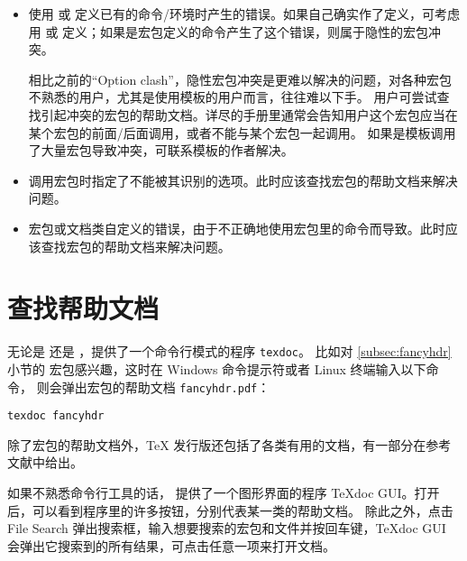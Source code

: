 \begin{itemize}
\item {}

使用  或  定义已有的命令/环境时产生的错误。如果自己确实作了定义，可考虑用
 或  定义；如果是宏包定义的命令产生了这个错误，则属于隐性的宏包冲突。

相比之前的“Option clash”，隐性宏包冲突是更难以解决的问题，对各种宏包不熟悉的用户，尤其是使用模板的用户而言，往往难以下手。
用户可尝试查找引起冲突的宏包的帮助文档。详尽的手册里通常会告知用户这个宏包应当在某个宏包的前面/后面调用，或者不能与某个宏包一起调用。
如果是模板调用了大量宏包导致冲突，可联系模板的作者解决。

\item {}

调用宏包时指定了不能被其识别的选项。此时应该查找宏包的帮助文档来解决问题。

\item {}

宏包或文档类自定义的错误，由于不正确地使用宏包里的命令而导致。此时应该查找宏包的帮助文档来解决问题。

\end{itemize}

\section{查找帮助文档}\label{sec:texdoc}

无论是  还是 ，提供了一个命令行模式的程序 \texttt{texdoc}。
比如对 \ref{subsec:fancyhdr} 小节的  宏包感兴趣，这时在 Windows 命令提示符或者 Linux 终端输入以下命令，
则会弹出宏包的帮助文档 \texttt{fancyhdr.pdf}：
\begin{verbatim}
texdoc fancyhdr
\end{verbatim}

除了宏包的帮助文档外，\TeX{} 发行版还包括了各类有用的文档，有一部分在参考文献中给出。

如果不熟悉命令行工具的话， 提供了一个图形界面的程序 TeXdoc GUI。打开后，可以看到程序里的许多按钮，分别代表某一类的帮助文档。
除此之外，点击 File Search 弹出搜索框，输入想要搜索的宏包和文件并按回车键，TeXdoc GUI 会弹出它搜索到的所有结果，可点击任意一项来打开文档。

